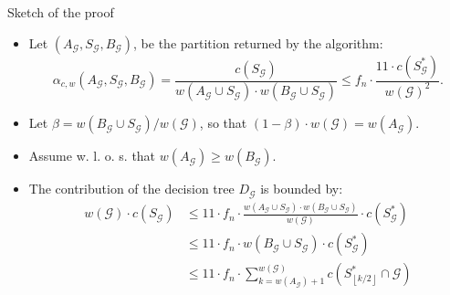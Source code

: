 \documentclass{beamer}
\newcommand{\br}[1]{\mathopen{}\left( #1 \right)}
\newcommand{\fl}[1]{\mathopen{}\left\lfloor #1 \right\rfloor}
\begin{document}
\begin{frame}{Sketch of the proof}
    \begin{itemize}
        \item Let $\br{A_{\mathcal{G}},S_{\mathcal{G}}, B_{\mathcal{G}}}$, be the partition returned by the algorithm:
        $$
        \alpha_{c,w}\br{A_{\mathcal{G}},S_{\mathcal{G}}, B_{\mathcal{G}}}=\frac{c\br{S_{\mathcal{G}}}}{w\br{A_{\mathcal{G}}\cup S_{\mathcal{G}}}\cdot w\br{B_{\mathcal{G}}\cup S_{\mathcal{G}}}}\leq f_n \cdot \frac{11\cdot c\br{S_{\mathcal{G}}^*}} {w\br{\mathcal{G}}^2}.
        $$
        \pause
        \item Let $\beta=w\br{B_{\mathcal{G}}\cup S_{\mathcal{G}}}/w\br{\mathcal{G}}$, so that $\br{1-\beta}\cdot w\br{\mathcal{G}} = w\br{A_\mathcal{G}}$.
        \pause
        \item Assume w. l. o. s. that $w\br{A_{\mathcal{G}}}\geq w\br{B_{\mathcal{G}}}$. 
        \pause
        \item The contribution of the decision tree $D_{\mathcal{G}}$ is bounded by:
        \begin{align*}
        w\br{\mathcal{G}}\cdot c\br{S_{\mathcal{G}}} &\leq 11 \cdot f_n\cdot \frac{w\br{A_{\mathcal{G}}\cup S_{\mathcal{G}}}\cdot w\br{B_{\mathcal{G}}\cup S_{\mathcal{G}}}}{w\br{\mathcal{G}}}\cdot c\br{S_{\mathcal{G}}^*}\\
        & \leq 
        11 \cdot f_n\cdot w\br{B_{\mathcal{G}}\cup S_{\mathcal{G}}}\cdot c\br{S_{\mathcal{G}}^*}
        \\ & \leq 
        11 \cdot f_n\cdot \sum_{k=w\br{A_{\mathcal{G}}}+1}^{w\br{\mathcal{G}}}c\br{S_{\fl{k/2}}^*\cap \mathcal{G}}
        \end{align*}
    \end{itemize}
\end{frame}
\end{document}
